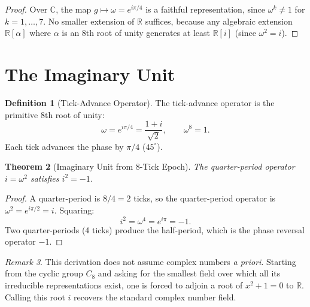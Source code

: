 \documentclass[12pt,a4paper]{article}
\newtheorem{theorem}{Theorem}[section]
\theoremstyle{definition}
\newtheorem{definition}[theorem]{Definition}
\theoremstyle{remark}
\newtheorem{remark}[theorem]{Remark}
\begin{document}
\begin{proof}
Over $\mathbb{C}$, the map $g \mapsto \omega = e^{i\pi/4}$
is a faithful representation, since $\omega^k \neq 1$ for
$k = 1, \ldots, 7$.  No smaller extension of $\mathbb{R}$
suffices, because any algebraic extension $\mathbb{R}[\alpha]$
where $\alpha$ is an 8th root of unity generates at least
$\mathbb{R}[i]$ (since $\omega^2 = i$).
\end{proof}

\section{The Imaginary Unit}
\label{sec:i}

\begin{definition}[Tick-Advance Operator]
\label{def:omega}
The tick-advance operator is the primitive 8th root of unity:
\begin{equation}
  \omega = e^{i\pi/4}
  = \frac{1+i}{\sqrt{2}},
  \qquad \omega^8 = 1.
\end{equation}
Each tick advances the phase by $\pi/4$ ($45^\circ$).
\end{definition}

\begin{theorem}[Imaginary Unit from 8-Tick Epoch]
\label{thm:i}
The quarter-period operator $i = \omega^2$ satisfies
$i^2 = -1$.
\end{theorem}

\begin{proof}
A quarter-period is $8/4 = 2$ ticks, so the quarter-period
operator is $\omega^2 = e^{i\pi/2} = i$.  Squaring:
\begin{equation}
  i^2 = \omega^4 = e^{i\pi} = -1.
\end{equation}
Two quarter-periods (4 ticks) produce the half-period,
which is the phase reversal operator $-1$.
\end{proof}

\begin{remark}
This derivation does not assume complex numbers \emph{a priori}.
Starting from the cyclic group $C_8$ and asking for the
smallest field over which all its irreducible representations
exist, one is forced to adjoin a root of $x^2 + 1 = 0$ to
$\mathbb{R}$.  Calling this root $i$ recovers the standard
complex number field.
\end{remark}

\end{document}
